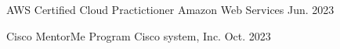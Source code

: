 

\begin{cvhonors}

  \cvhonor
    {AWS Certified Cloud Practictioner} %
    {Amazon Web Services} %
    {} %
    {Jun. 2023} %

\end{cvhonors}
\begin{cvhonors}

  \cvhonor
    {Cisco MentorMe Program} %
    {Cisco system, Inc.} %
    {} %
    {Oct. 2023} %

\end{cvhonors}
